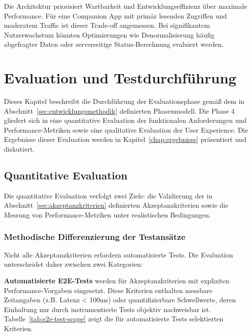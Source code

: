 Die Architektur priorisiert Wartbarkeit und Entwicklungseffizienz über maximale Performance. Für eine Companion App mit primär lesenden Zugriffen und moderatem Traffic ist dieser Trade-off angemessen. Bei signifikantem Nutzerwachstum könnten Optimierungen wie Denormalisierung häufig abgefragter Daten oder serverseitige Status-Berechnung evaluiert werden.

\section{Evaluation und Testdurchführung}
\label{sec:evaluation}

Dieses Kapitel beschreibt die Durchführung der Evaluationsphase gemäß dem in Abschnitt~\ref{sec:entwicklungsmethodik} definierten Phasenmodell. Die Phase 4 gliedert sich in eine quantitative Evaluation der funktionalen Anforderungen und Performance-Metriken sowie eine qualitative Evaluation der User Experience. Die Ergebnisse dieser Evaluation werden in Kapitel~\ref{chap:ergebnisse} präsentiert und diskutiert.

\subsection{Quantitative Evaluation}
\label{sec:quant-eval-durchfuehrung}

Die quantitative Evaluation verfolgt zwei Ziele: die Validierung der in Abschnitt~\ref{sec:akzeptanzkriterien} definierten Akzeptanzkriterien sowie die Messung von Performance-Metriken unter realistischen Bedingungen.

\subsubsection{Methodische Differenzierung der Testansätze}

Nicht alle Akzeptanzkriterien erfordern automatisierte Tests. Die Evaluation unterscheidet daher zwischen zwei Kategorien:

\textbf{Automatisierte E2E-Tests} werden für Akzeptanzkriterien mit expliziten Performance-Vorgaben eingesetzt. Diese Kriterien enthalten messbare Zeitangaben (z.B. \glqq Latenz < 100ms\grqq{}) oder quantifizierbare Schwellwerte, deren Einhaltung nur durch instrumentierte Tests objektiv nachweisbar ist. Tabelle~\ref{tab:e2e-test-scope} zeigt die für automatisierte Tests selektierten Kriterien.

